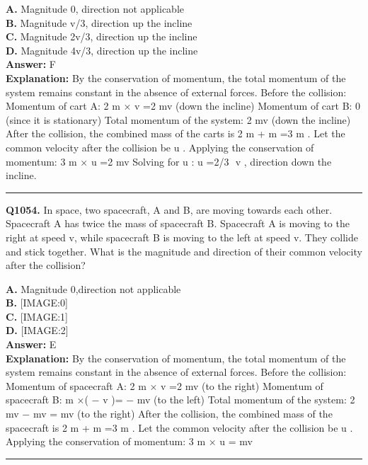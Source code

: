 \documentclass[12pt]{article}
\begin{document}
\textbf{A.} Magnitude 0, direction not applicable \\
\textbf{B.} Magnitude v/3, direction up the incline \\
\textbf{C.} Magnitude 2v/3, direction up the incline \\
\textbf{D.} Magnitude 4v/3, direction up the incline \\

\textbf{Answer:} F \\
\textbf{Explanation:} By the conservation of momentum, the total momentum of the system remains constant in the absence of external forces. Before the collision:
Momentum of cart A: 2
m
×
v
=2
mv
(down the incline)
Momentum of cart B: 0 (since it is stationary)
Total momentum of the system: 2
mv
(down the incline)
After the collision, the combined mass of the carts is 2
m
+
m
=3
m
. Let the common velocity after the collision be
u
. Applying the conservation of momentum:
3
m
×
u
=2
mv
Solving for
u
:
u
=2/3
​
v
, direction down the incline.

\hrule
\vspace{1em}


\noindent
\textbf{Q1054.} In space, two spacecraft, A and B, are moving towards each other. Spacecraft A has twice the mass of spacecraft B. Spacecraft A is moving to the right at speed v, while spacecraft B is moving to the left at speed v. They collide and stick together. What is the magnitude and direction of their common velocity after the collision?



\textbf{A.} Magnitude 0,direction not applicable \\
\textbf{B.} [IMAGE:0] \\
\textbf{C.} [IMAGE:1] \\
\textbf{D.} [IMAGE:2] \\

\textbf{Answer:} E \\
\textbf{Explanation:} By the conservation of momentum, the total momentum of the system remains constant in the absence of external forces. Before the collision:
Momentum of spacecraft A: 2
m
×
v
=2
mv
(to the right)
Momentum of spacecraft B:
m
×(
−
v
)=
−
mv
(to the left)
Total momentum of the system: 2
mv
−
mv
=
mv
(to the right)
After the collision, the combined mass of the spacecraft is 2
m
+
m
=3
m
. Let the common velocity after the collision be
u
. Applying the conservation of momentum:
3
m
×
u
=
mv

\hrule
\vspace{1em}
\end{document}
